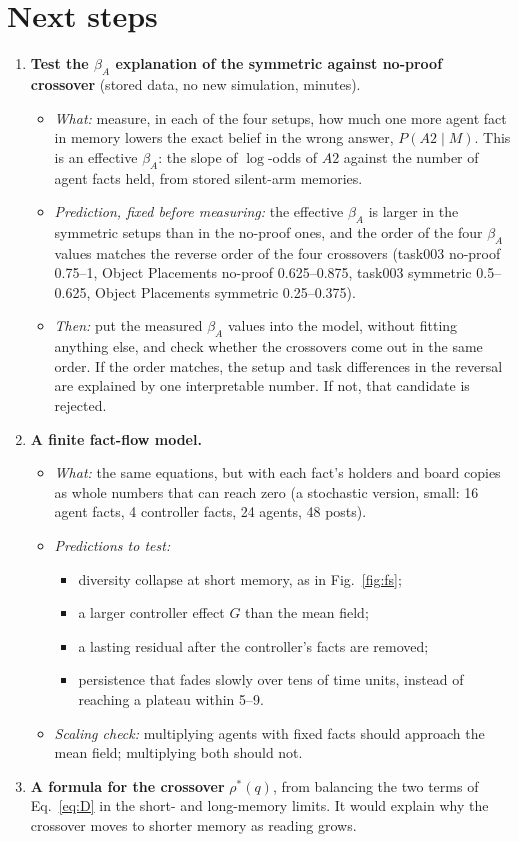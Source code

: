 \documentclass[10pt,a4paper]{article}
\begin{document}
\section{Next steps}
\label{sec:next}
\begin{enumerate}
\item \textbf{Test the $\beta_A$ explanation of the symmetric against no-proof crossover} (stored data, no new
  simulation, minutes).
  \begin{itemize}
  \item \emph{What:} measure, in each of the four setups, how much one more agent fact in memory lowers the exact belief
    in the wrong answer, $P(A2\mid M)$. This is an effective $\beta_A$: the slope of $\log$-odds of $A2$ against the
    number of agent facts held, from stored silent-arm memories.
  \item \emph{Prediction, fixed before measuring:} the effective $\beta_A$ is larger in the symmetric setups than in
    the no-proof ones, and the order of the four $\beta_A$ values matches the reverse order of the four crossovers
    (task003 no-proof 0.75--1, Object Placements no-proof 0.625--0.875, task003 symmetric 0.5--0.625, Object Placements
    symmetric 0.25--0.375).
  \item \emph{Then:} put the measured $\beta_A$ values into the model, without fitting anything else, and check whether
    the crossovers come out in the same order. If the order matches, the setup and task differences in the reversal
    are explained by one interpretable number. If not, that candidate is rejected.
  \end{itemize}
\item \textbf{A finite fact-flow model.}
  \begin{itemize}
  \item \emph{What:} the same equations, but with each fact's holders and board copies as whole numbers that can reach
    zero (a stochastic version, small: 16 agent facts, 4 controller facts, 24 agents, 48 posts).
  \item \emph{Predictions to test:}
    \begin{itemize}
    \item diversity collapse at short memory, as in Fig.~\ref{fig:fs};
    \item a larger controller effect $G$ than the mean field;
    \item a lasting residual after the controller's facts are removed;
    \item persistence that fades slowly over tens of time units, instead of reaching a plateau within 5--9.
    \end{itemize}
  \item \emph{Scaling check:} multiplying agents with fixed facts should approach the mean field; multiplying both
    should not.
  \end{itemize}
\item \textbf{A formula for the crossover} $\rho^*(q)$, from balancing the two terms of Eq.~\eqref{eq:D} in the
  short- and long-memory limits. It would explain why the crossover moves to shorter memory as reading grows.
\end{enumerate}
\end{document}
